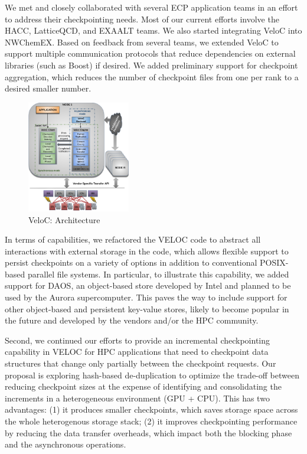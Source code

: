 We met and closely collaborated with several ECP application teams in
an effort to address their checkpointing needs. Most of our current
efforts involve the HACC, LatticeQCD, and EXAALT teams. We also
started integrating VeloC into NWChemEX. Based on feedback from
several teams, we extended VeloC to support multiple communication
protocols that reduce dependencies on external libraries (such as
Boost) if desired.  We added preliminary support for
checkpoint aggregation, which reduces the number of checkpoint files
from one per rank to a desired smaller number.

\begin{figure}
  \includegraphics[width=0.4\textwidth]{projects/2.3.4-DataViz/2.3.4.14-VeloC-SZ/veloc-arch}
  \caption{VeloC: Architecture}%
  \label{fig:veloc:arch}%
\end{figure}

In terms of capabilities, we refactored the VELOC code to abstract all
interactions with external storage in the code, which allows flexible
support to persist checkpoints on a variety of options in addition to
conventional POSIX-based parallel file systems. In particular, to
illustrate this capability, we added support for DAOS, an object-based
store developed by Intel and planned to be used by the Aurora
supercomputer. This paves the way to include support for other
object-based and persistent key-value stores, likely to become popular
in the future and developed by the vendors and/or the HPC community.

Second, we continued our efforts to provide an incremental
checkpointing capability in VELOC for HPC applications that need to
checkpoint data structures that change only partially between the
checkpoint requests.  Our proposal is exploring hash-based
de-duplication to optimize the trade-off between reducing checkpoint
sizes at the expense of identifying and consolidating the increments
in a heterogeneous environment (GPU + CPU).  This has two advantages:
(1) it produces smaller checkpoints, which saves storage space across
the whole heterogenous storage stack; (2) it improves checkpointing
performance by reducing the data transfer overheads, which impact both
the blocking phase and the asynchronous operations.

